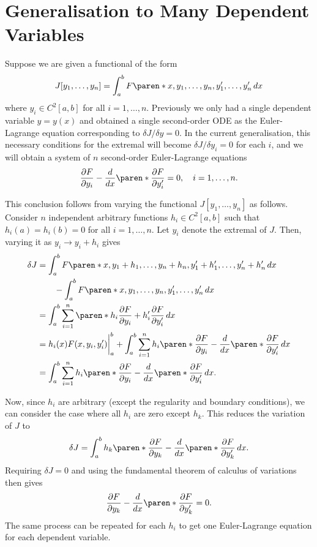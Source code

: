 \documentclass[11pt]{penrose}
\begin{document}
\section{Generalisation to Many Dependent Variables}
Suppose we are given a functional of the form
\begin{equation}
    J[y_1, \dots, y_n] = \int_a^b F\paren*{x, y_1, \dots, y_n, y'_1, \dots, y'_n} \,dx
\end{equation}
where $y_i \in C^2 [a,b]$ for all $i=1, \dots, n$. Previously we only had a single dependent variable $y = y(x)$ and obtained a single second-order ODE as the Euler-Lagrange equation corresponding to $\delta J / \delta y = 0$. In the current generalisation, this necessary conditions for the extremal will become $\delta J / \delta y_i = 0$ for each $i$, and we will obtain a system of $n$ second-order Euler-Lagrange equations
\begin{equation}
    \frac{\pd F}{\pd y_i} - \frac{d}{dx} \paren*{\frac{\pd F}{\pd y'_i}} = 0,
    \quad i = 1, \dots, n.
\end{equation}

This conclusion follows from varying the functional $J[y_1, \dots, y_n]$ as follows. Consider $n$ independent arbitrary functions $h_i \in C^2[a,b]$ such that $h_i(a) = h_i(b) = 0$ for all $i = 1, \dots, n$. Let $y_i$ denote the extremal of $J$. Then, varying it as $y_i \to y_i + h_i$ gives
\begin{align}
    \delta J
    &= \int_a^b F\paren*{x, y_1 + h_1, \dots, y_n + h_n, y'_1 + h'_1, \dots, y'_n + h'_n} \,dx\\
    &\qquad - \int_a^b F\paren*{x, y_1, \dots, y_n, y'_1, \dots, y'_n} \,dx\\
    &= \int_a^b \sum_{i=1}^{n} \paren*{h_i \frac{\pd F}{\pd y_i} + h'_i \frac{\pd F}{\pd y'_i}} \,dx\\
    &= \bigg. h_i(x) F(x, y_i, y'_i) \bigg|_{a}^{b}
    + \int_a^b \sum_{i=1}^{n} h_i \paren*{ \frac{\pd F}{\pd y_i} - \frac{d}{dx} \paren*{\frac{\pd F}{\pd y'_i}}} \,dx\\
    &= \int_a^b \sum_{i=1}^{n} h_i \paren*{ \frac{\pd F}{\pd y_i} - \frac{d}{dx} \paren*{\frac{\pd F}{\pd y'_i}}} \,dx.
\end{align}

Now, since $h_i$ are arbitrary (except the regularity and boundary conditions), we can consider the case where all $h_i$ are zero except $h_k$. This reduces the variation of $J$ to
\begin{equation}
    \delta J = \int_a^b h_k \paren*{ \frac{\pd F}{\pd y_k} - \frac{d}{dx} \paren*{\frac{\pd F}{\pd y'_k}}} \,dx.
\end{equation}
Requiring $\delta J = 0$ and using the fundamental theorem of calculus of variations then gives
\begin{equation}
    \frac{\pd F}{\pd y_k} - \frac{d}{dx} \paren*{\frac{\pd F}{\pd y'_k}} = 0.
\end{equation}
The same process can be repeated for each $h_i$ to get one Euler-Lagrange equation for each dependent variable.
\end{document}
